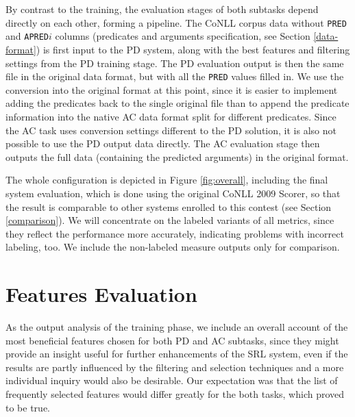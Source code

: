 \documentclass[12pt,notitlepage,a4paper]{report}
\begin{document}
By contrast to the training, the evaluation stages of both subtasks depend directly on each other, forming a pipeline. The CoNLL corpus data without \texttt{PRED} and \texttt{APRED$i$} columns (predicates and arguments specification, see Section \ref{data-format}) is first input to the PD system, along with the best features and filtering settings from the PD training stage. The PD evaluation output is then the same file in the original data format, but with all the \texttt{PRED} values filled in. We use the conversion into the original format at this point, since it is easier to implement adding the predicates back to the single original file than to append the predicate information into the native AC data format split for different predicates. Since the AC task uses conversion settings different to the PD solution, it is also not possible to use the PD output data directly. The AC evaluation stage then outputs the full data (containing the predicted arguments) in the original format.

The whole configuration is depicted in Figure \ref{fig:overall}, including the final system evaluation, which is done using the original CoNLL 2009 Scorer, so that the result is comparable to other systems enrolled to this contest (see Section \ref{comparison}). We will concentrate on the labeled variants of all metrics, since they reflect the performance more accurately, indicating problems with incorrect labeling, too. We include the non-labeled measure outputs only for comparison.

\section{Features Evaluation}\label{selfeats}

As the output analysis of the training phase, we include an overall account of the most beneficial features chosen for both PD and AC subtasks, since they might provide an insight useful for further enhancements of the SRL system, even if the results are partly influenced by the filtering and selection techniques and a more individual inquiry would also be desirable. Our expectation was that the list of frequently selected features would differ greatly for the both tasks, which proved to be true.
\end{document}
